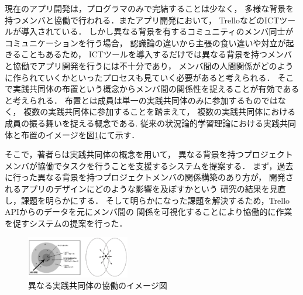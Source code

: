 
現在のアプリ開発は，プログラマのみで完結することは少なく，
多様な背景を持つメンバと協働で行われる．またアプリ開発において，
Trello\cite{trello}などのICTツールが導入されている．
しかし異なる背景を有するコミュニティのメンバ同士がコミュニケーションを行う場合，
認識論の違いから主張の食い違いや対立が起きることもあるため\cite{conflict}，
ICTツールを導入するだけでは異なる背景を持つメンバと協働でアプリ開発を行うには不十分であり，
メンバ間の人間関係がどのように作られていくかといったプロセスも見ていく必要があると考えられる．
そこで実践共同体\cite{Matsumoto}の布置という概念からメンバ間の関係性を捉えることが有効であると考えられる．
布置とは成員は単一の実践共同体のみに参加するものではなく，
複数の実践共同体に参加することを踏まえて，
複数の実践共同体における成員の振る舞いを捉える概念である.
従来の状況論的学習理論における実践共同体\cite{copImg}と布置のイメージを図\ref{cop-overlap}にて示す．

そこで，著者らは実践共同体の概念を用いて，
異なる背景を持つプロジェクトメンバが協働でタスクを行うことを支援するシステムを提案する．
まず，過去に行った異なる背景を持つプロジェクトメンバの関係構築のあり方が，
開発されるアプリのデザインにどのような影響を及ぼすかという
研究の結果を見直し，課題を明らかにする．
そして明らかになった課題を解決するため，Trello APIからのデータを元にメンバ間の
関係を可視化することにより協働的に作業を促すシステムの提案を行った．

\begin{figure}[h]
  \centering
  \includegraphics[width=0.4\textwidth]{img/cop-overlap.eps}
  \caption{異なる実践共同体の協働のイメージ図}
  \label{cop-overlap}
\end{figure}
